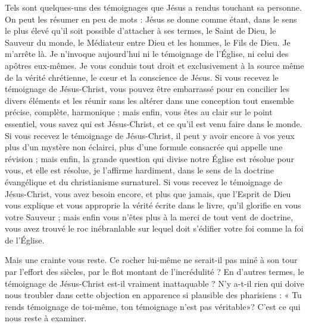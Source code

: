 Tels sont quelques-uns des témoignages que Jésus a rendus touchant sa personne. On peut les résumer en peu de mots : Jésus se donne comme étant, dans le sens le plus élevé qu’il soit possible d’attacher à ses termes, le Saint de Dieu, le Sauveur du monde, le Médiateur entre Dieu et les hommes, le Fils de Dieu. Je m’arrête là. Je n’invoque aujourd’hui ni le témoignage de l’Église, ni celui des apôtres eux-mêmes. Je vous conduis tout droit et exclusivement à la source même de la vérité chrétienne, le cœur et la conscience de Jésus. Si vous recevez le témoignage de Jésus-Christ, vous pouvez être embarrassé pour en concilier les divers éléments et les réunir sans les altérer dans une conception tout ensemble précise, complète, harmonique ; mais enfin, vous êtes au clair sur le point essentiel, vous savez qui est Jésus-Christ, et ce qu’il est venu faire dans le monde. Si vous recevez le témoignage de Jésus-Christ, il peut y avoir encore à vos yeux plus d’un mystère non éclairci, plus d’une formule consacrée qui appelle une révision ; mais enfin, la grande question qui divise notre Église est résolue pour vous, et elle est résolue, je l’affirme hardiment, dans le sens de la doctrine évangélique et du christianisme surnaturel. Si vous recevez le témoignage de Jésus-Christ, vous avez besoin encore, et plus que jamais, que l’Esprit de Dieu vous explique et vous approprie la vérité écrite dans le livre, qu’il glorifie en vous votre Sauveur ; mais enfin vous n’êtes plus à la merci de tout vent de doctrine, vous avez trouvé le roc inébranlable sur lequel doit s’édifier votre foi comme la foi de l’Église.

Mais une crainte vous reste. Ce rocher lui-même ne serait-il pas miné à son tour par l’effort des siècles, par le flot montant de l’incrédulité ? En d’autres termes, le témoignage de Jésus-Christ est-il vraiment inattaquable ? N’y a-t-il rien qui doive nous troubler dans cette objection en apparence si plausible des pharisiens : « Tu rends témoignage de toi-même, ton témoignage n’est pas véritable»? C’est ce qui nous reste à examiner.

